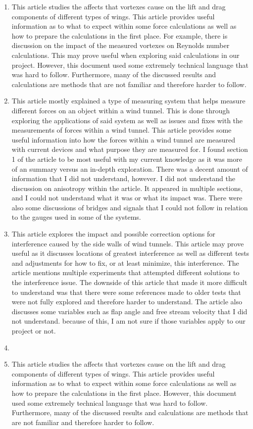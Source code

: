 \documentclass[12pt,letterpaper]{article}
\begin{document}
\begin{enumerate}
	\item \cite{Gerontakos2007} This article studies the affects that vortexes cause on the lift and drag components of different types of wings. This article provides useful information as to what to expect within some force calculations as well as how to prepare the calculations in the first place. For example, there is discussion on the impact of the measured vortexes on Reynolds number calculations. This may prove useful when exploring said calculations in our project. However, this document used some extremely technical language that was hard to follow. Furthermore, many of the discussed results and calculations are methods that are not familiar and therefore harder to follow.
	\item \cite{Portman2009} This article mostly explained a type of measuring system that helps measure different forces on an object within a wind tunnel. This is done through exploring the applications of said system as well as issues and fixes with the measurements of forces within a wind tunnel. This article provides some useful information into how the forces within a wind tunnel are measured with current devices and what purpose they are measured for. I found section 1 of the article to be most useful with my current knowledge as it was more of an summary versus an in-depth exploration. There was a decent amount of information that I did not understand, however. I did not understand the discussion on anisotropy within the article. It appeared in multiple sections, and I could not understand what it was or what its impact was. There were also some discussions of bridges and signals that I could not follow in relation to the gauges used in some of the systems.
	\item \cite{Motohashi1983} This article explores the impact and possible correction options for interference caused by the side walls of wind tunnels. This article may prove useful as it discusses locations of greatest interference as well as different tests and adjustments for how to fix, or at least minimize, this interference. The article mentions multiple experiments that attempted different solutions to the interference issue. The downside of this article that made it more difficult to understand was that there were some references made to older tests that were not fully explored and therefore harder to understand. The article also discusses some variables such as flap angle and free stream velocity that I did not understand. because of this, I am not sure if those variables apply to our project or not.
	\item \cite{Nan2013}
	\item \cite{Gerontakos2007} This article studies the affects that vortexes cause on the lift and drag components of different types of wings. This article provides useful information as to what to expect within some force calculations as well as how to prepare the calculations in the first place. However, this document used some extremely technical language that was hard to follow. Furthermore, many of the discussed results and calculations are methods that are not familiar and therefore harder to follow.
	

\end{enumerate}
\end{document}
